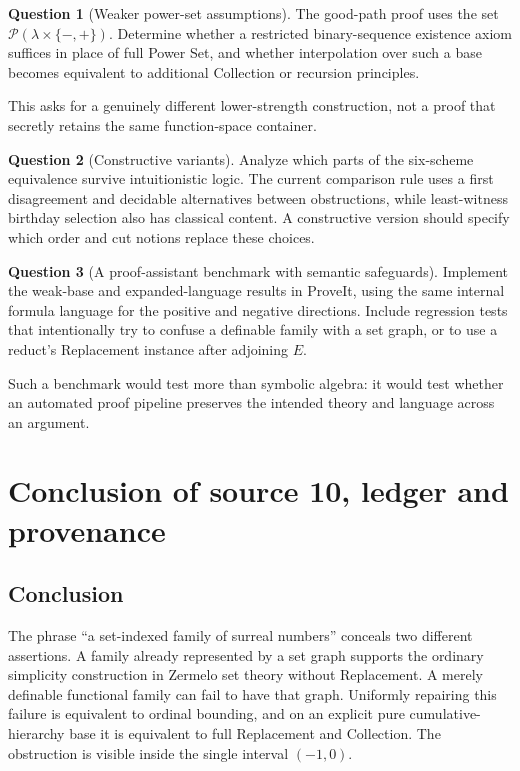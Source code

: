 \documentclass[11pt,letterpaper]{article}
\theoremstyle{definition}
\newtheorem{question}[question]{Question}\aliascntresetthe{question}
\theoremstyle{remark}
\newcommand{\Pow}{\mathcal P}
\newcommand{\signs}{\{-,+\}}
\begin{document}
\begin{question}[Weaker power-set assumptions]\label{hset:zr:q:powerset}
The good-path proof uses the set $\Pow(\lambda\times\signs)$. Determine whether a restricted binary-sequence existence axiom suffices in place of full Power Set, and whether interpolation over such a base becomes equivalent to additional Collection or recursion principles.
\end{question}
This asks for a genuinely different lower-strength construction, not a proof that secretly retains the same function-space container.

\begin{question}[Constructive variants]\label{hset:zr:q:constructive}
Analyze which parts of the six-scheme equivalence survive intuitionistic logic. The current comparison rule uses a first disagreement and decidable alternatives between obstructions, while least-witness birthday selection also has classical content. A constructive version should specify which order and cut notions replace these choices.
\end{question}

\begin{question}[A proof-assistant benchmark with semantic safeguards]\label{hset:zr:q:benchmark}
Implement the weak-base and expanded-language results in ProveIt, using the same internal formula language for the positive and negative directions. Include regression tests that intentionally try to confuse a definable family with a set graph, or to use a reduct's Replacement instance after adjoining $E$.
\end{question}
Such a benchmark would test more than symbolic algebra: it would test whether an automated proof pipeline preserves the intended theory and language across an argument.

\section{Conclusion of source 10, ledger and provenance}
\label{hset:zr:sec:provenance}

\subsection{Conclusion}
The phrase ``a set-indexed family of surreal numbers'' conceals two different assertions. A family already represented by a set graph supports the ordinary simplicity construction in Zermelo set theory without Replacement. A merely definable functional family can fail to have that graph. Uniformly repairing this failure is equivalent to ordinal bounding, and on an explicit pure cumulative-hierarchy base it is equivalent to full Replacement and Collection. The obstruction is visible inside the single interval $(-1,0)$.
\end{document}
